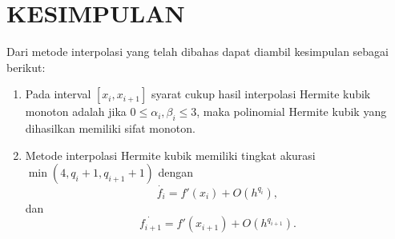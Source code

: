 \chapter{KESIMPULAN}

Dari metode interpolasi yang telah dibahas dapat diambil kesimpulan sebagai berikut:

\begin{enumerate}
    
    \item Pada interval $[x_i,x_{i+1}]$ syarat cukup hasil interpolasi Hermite kubik monoton adalah jika $0 \leq \alpha_i, \beta_i \leq 3$,
    maka polinomial Hermite kubik yang dihasilkan memiliki sifat monoton.


    \item Metode interpolasi Hermite kubik memiliki tingkat akurasi $\min(4, q_i+1, q_{i+1}+1)$ dengan
    $$\dot{f_i}=f'(x_i) + O(h^{q_i}),$$ 
    dan $$\dot{f_{i+1}}=f'(x_{i+1}) + O(h^{q_{i+1}}).$$


\end{enumerate}

